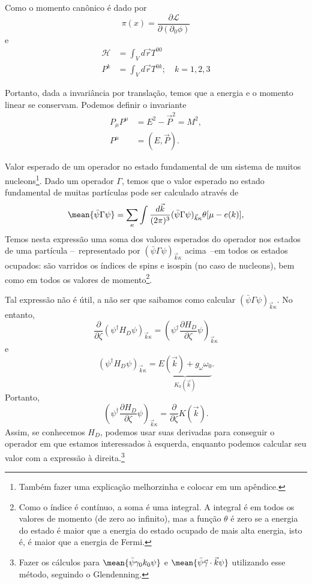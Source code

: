 Como o momento canônico é dado por 
\begin{equation}
	\pi(x) = \frac{\partial \mathcal{L}}{\partial(\partial_0 \phi)}
\end{equation}
%
e
\begin{align}
	\mathcal{H} &= \int_V d\vec{r} T^{00} \\
	P^k &= \int_V d\vec{r} T^{0k}; \quad k= 1,2,3
\end{align}

Portanto, dada a invariância por translação, temos que a energia e o momento linear se conservam. Podemos definir o invariante
\begin{align}
	P_\mu P^\mu &= E^2 - \vec{P}^2 = M^2, \\
	P^\mu &= (E, \vec{P}).
\end{align}
 
Valor esperado de um operador no estado fundamental de um sistema de muitos nucleons\footnote{Também fazer uma explicação melhorzinha e colocar em um apêndice.}. Dado um operador $\Gamma$, temos que o valor esperado no estado fundamental de muitas partículas pode ser calculado através de
\begin{equation}
	\mean{\bar\psi\Gamma\psi} = \sum_\kappa \int \frac{d\vec{k}}{(2\pi)^3} (\bar\psi\Gamma\psi)_{\vec{k}\kappa} \theta[\mu-e(k)],
\end{equation}
%
Temos nesta expressão uma soma dos valores esperados do operador nos estados de uma partícula --~representado por $(\bar\psi\Gamma\psi)_{\vec{k}\kappa}$ acima~--em todos os estados ocupados: são varridos os índices de spins e isospin (no caso de nucleons), bem como em todos os valores de momento\footnote{Como o índice é contínuo, a soma é uma integral. A integral é em todos os valores de momento (de zero ao infinito), mas a função $\theta$ é zero se a energia do estado é maior que a energia do estado ocupado de mais alta energia, isto é, é maior que a energia de Fermi.}. 

Tal expressão não é útil, a não ser que saibamos como calcular $(\bar\psi\Gamma\psi)_{\vec{k}\kappa}$. No entanto,
\begin{equation}
	\frac{\partial}{\partial \zeta} (\psi^\dagger H_D\psi)_{\vec{k}\kappa} = (\psi^\dagger\frac{\partial H_D}{\partial\zeta}\psi)_{\vec{k}\kappa}
\end{equation}
%
e
\begin{equation}
	(\psi^\dagger H_D\psi)_{\vec{k}\kappa} = \underbrace{E(\vec{k}) + g_\omega\omega_0}_{K_0(\vec{k})}.
\end{equation}
%
Portanto,
\begin{equation}
	(\psi^\dagger\frac{\partial H_D}{\partial\zeta}\psi)_{\vec{k}\kappa} = \frac{\partial}{\partial\zeta}K(\vec{k}).
\end{equation}
%
Assim, se conhecemos $H_D$, podemos usar suas derivadas para conseguir o operador em que estamos interessados à esquerda, enquanto podemos calcular seu valor com a expressão à direita.\footnote{Fazer os cálculos para $\mean{\bar\psi\gamma_0k_0\psi}$ e $\mean{\bar\psi\vec{\gamma}\cdot\vec{k}\psi}$ utilizando esse método, seguindo o Glendenning.}

